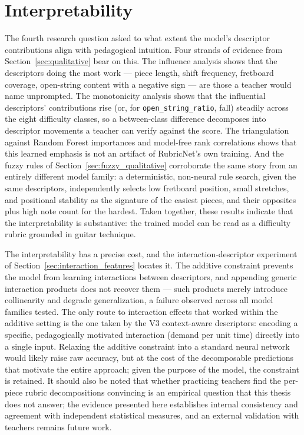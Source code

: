 \section{Interpretability}
\label{sec:disc_interpretability}
The fourth research question asked to what extent the model's descriptor contributions align with pedagogical intuition. Four strands of evidence from Section~\ref{sec:qualitative} bear on this. The influence analysis shows that the descriptors doing the most work --- piece length, shift frequency, fretboard coverage, open-string content with a negative sign --- are those a teacher would name unprompted. The monotonicity analysis shows that the influential descriptors' contributions rise (or, for \texttt{open\_string\_ratio}, fall) steadily across the eight difficulty classes, so a between-class difference decomposes into descriptor movements a teacher can verify against the score. The triangulation against Random Forest importances and model-free rank correlations shows that this learned emphasis is not an artifact of RubricNet's own training. And the fuzzy rules of Section~\ref{sec:fuzzy_qualitative} corroborate the same story from an entirely different model family: a deterministic, non-neural rule search, given the same descriptors, independently selects low fretboard position, small stretches, and positional stability as the signature of the easiest pieces, and their opposites plus high note count for the hardest. Taken together, these results indicate that the interpretability is substantive: the trained model can be read as a difficulty rubric grounded in guitar technique.

The interpretability has a precise cost, and the interaction-descriptor experiment of Section~\ref{sec:interaction_features} locates it. The additive constraint prevents the model from learning interactions between descriptors, and appending generic interaction products does not recover them --- such products merely introduce collinearity and degrade generalization, a failure observed across all model families tested. The only route to interaction effects that worked within the additive setting is the one taken by the V3 context-aware descriptors: encoding a specific, pedagogically motivated interaction (demand per unit time) directly into a single input. Relaxing the additive constraint into a standard neural network would likely raise raw accuracy, but at the cost of the decomposable predictions that motivate the entire approach; given the purpose of the model, the constraint is retained. It should also be noted that whether practicing teachers find the per-piece rubric decompositions convincing is an empirical question that this thesis does not answer; the evidence presented here establishes internal consistency and agreement with independent statistical measures, and an external validation with teachers remains future work.
